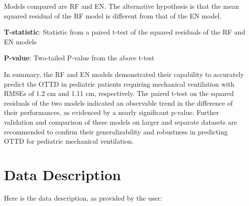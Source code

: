 \documentclass[11pt]{article}
\begin{document}
\begin{table}[h]
\caption{Paired t-test results for squared residuals of RF and EN models}
\label{table:t_test_results}
\begin{threeparttable}
\renewcommand{\TPTminimum}{\linewidth}
\begin{tablenotes}
\footnotesize
\item Models compared are RF and EN. The alternative hypothesis is that the mean squared residual of the RF model is different from that of the EN model.
\item \textbf{T-statistic}: Statistic from a paired t-test of the squared residuals of the RF and EN models
\item \textbf{P-value}: Two-tailed P-value from the above t-test
\end{tablenotes}
\end{threeparttable}
\end{table}


In summary, the RF and EN models demonstrated their capability to accurately predict the OTTD in pediatric patients requiring mechanical ventilation with RMSEs of 1.2 cm and 1.11 cm, respectively. The paired t-test on the squared residuals of the two models indicated an observable trend in the difference of their performances, as evidenced by a nearly significant p-value. Further validation and comparison of these models on larger and separate datasets are recommended to confirm their generalizability and robustness in predicting OTTD for pediatric mechanical ventilation.


\clearpage
\appendix

\section{Data Description} \label{sec:data_description} Here is the data description, as provided by the user:
\end{document}
